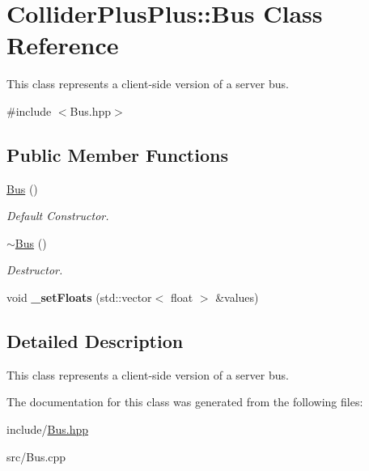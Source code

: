 \hypertarget{classColliderPlusPlus_1_1Bus}{\section{Collider\-Plus\-Plus\-:\-:Bus Class Reference}
\label{classColliderPlusPlus_1_1Bus}
}


This class represents a client-\/side version of a server bus.  




{\ttfamily \#include $<$Bus.\-hpp$>$}

\subsection*{Public Member Functions}
\begin{DoxyCompactItemize}
\item 
\hypertarget{classColliderPlusPlus_1_1Bus_aacf35e62456128245a02db34334f9a3d}{\hyperlink{classColliderPlusPlus_1_1Bus_aacf35e62456128245a02db34334f9a3d}{Bus} ()}\label{classColliderPlusPlus_1_1Bus_aacf35e62456128245a02db34334f9a3d}

\begin{DoxyCompactList}\small\item\em Default Constructor. \end{DoxyCompactList}\item 
\hypertarget{classColliderPlusPlus_1_1Bus_aab6194602b6a5a4fa87987f7c1adf35d}{\hyperlink{classColliderPlusPlus_1_1Bus_aab6194602b6a5a4fa87987f7c1adf35d}{$\sim$\-Bus} ()}\label{classColliderPlusPlus_1_1Bus_aab6194602b6a5a4fa87987f7c1adf35d}

\begin{DoxyCompactList}\small\item\em Destructor. \end{DoxyCompactList}\item 
\hypertarget{classColliderPlusPlus_1_1Bus_ad2004886f74af2095a0ea06b1048fc95}{void {\bfseries \-\_\-set\-Floats} (std\-::vector$<$ float $>$ \&values)}\label{classColliderPlusPlus_1_1Bus_ad2004886f74af2095a0ea06b1048fc95}

\end{DoxyCompactItemize}


\subsection{Detailed Description}
This class represents a client-\/side version of a server bus. 

The documentation for this class was generated from the following files\-:\begin{DoxyCompactItemize}
\item 
include/\hyperlink{Bus_8hpp}{Bus.\-hpp}\item 
src/Bus.\-cpp\end{DoxyCompactItemize}
